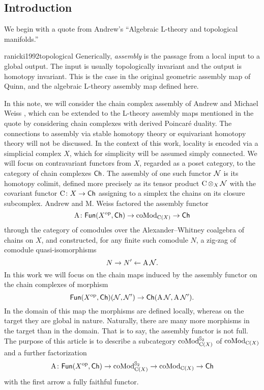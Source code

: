 
\subsection{Introduction} \label{ss:introduction}

We begin with a quote from Andrew's ``Algebraic L-theory and topological manifolds.''
\begin{displaycquote}{ranicki1992topological}
	Generically, \textit{assembly} is the passage from a local input to a global output.
	The input is usually topologically invariant and the output is homotopy invariant.
	This is the case in the original geometric assembly map of Quinn, and the algebraic L-theory assembly map defined here.
\end{displaycquote}
In this note, we will consider the chain complex assembly of Andrew and Michael Weiss \cite{ranicki1990assembly}, which can be extended to the L-theory assembly maps mentioned in the quote by considering chain complexes with derived Poincar\'e duality.
The connections to assembly via stable homotopy theory \cite{weiss1995asssembly} or equivariant homotopy theory \cite{davis1998assembly} will not be discussed.
In the context of this work, locality is encoded via a simplicial complex $X$, which for simplicity will be assumed simply connected.
We will focus on contravariant functors from $X$, regarded as a poset category, to the category of chain complexes $\mathsf{Ch}$.
The assembly of one such functor $\mathcal{N}$ is its homotopy colimit, defined more precisely as its tensor product $\operatorname{C} \operatorname*{\otimes}_X \mathcal{N}$ with the covariant functor $\operatorname{C} \colon X \to \mathsf{Ch}$ assigning to a simplex the chains on its closure subcomplex.
Andrew and M. Weiss factored the assembly functor
\[
\operatorname{A} \colon \mathsf{Fun}(X^{\mathrm{op}}, \mathsf{Ch}) \to \operatorname{coMod}_{\operatorname{C}(X)} \to \mathsf{Ch}
\]
through the category of comodules over the Alexander--Whitney coalgebra of chains on $X$, and constructed, for any finite such comodule $N$, a zig-zag of comodule quasi-isomorphisms
\[
N \to N' \leftarrow \operatorname{A} \mathcal{N}.
\]
In this work we will focus on the chain maps induced by the assembly functor on the chain complexes of morphism
\[
\mathsf{Fun}(X^{\mathrm{op}},\mathsf{Ch})(\mathcal{N},\mathcal{N}') \to \mathsf{Ch}(\operatorname{A} \mathcal{N}, \operatorname{A} \mathcal{N}').
\]
In the domain of this map the morphisms are defined locally, whereas on the target they are global in nature.
Naturally, there are many more morphisms in the target than in the domain.
That is to say, the assembly functor is not full.
The purpose of this article is to describe a subcategory $\operatorname{coMod}^{\mathbb{S}_2}_{\operatorname{C}(X)}$ of $\operatorname{coMod}_{\operatorname{C}(X)}$ and a further factorization
\[
\operatorname{A} \colon \mathsf{Fun}(X^{\mathrm{op}}, \mathsf{Ch}) \to
\operatorname{coMod}^{\mathbb{S}_2}_{\operatorname{C}(X)} \to
\operatorname{coMod}_{\operatorname{C}(X)} \to
\mathsf{Ch}
\]
with the first arrow a fully faithful functor.

